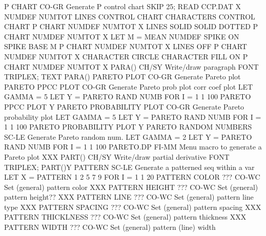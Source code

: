 P CHART                     CO-GR Generate P control chart
                                  SKIP 25; READ CCP.DAT X NUMDEF NUMTOT
                                  LINES CONTROL CHART
                                  CHARACTERS CONTROL CHART
                                  P CHART NUMDEF NUMTOT X
                                  LINES SOLID SOLID DOTTED
                                  P CHART NUMDEF NUMTOT X
                                  LET M = MEAN NUMDEF
                                  SPIKE ON
                                  SPIKE BASE M
                                  P CHART NUMDEF NUMTOT X
                                  LINES OFF
                                  P CHART NUMDEF NUMTOT X
                                  CHARACTER CIRCLE
                                  CHARACTER FILL ON
                                  P CHART NUMDEF NUMTOT X
PARA()                      CH/SY Write/draw paragraph
                                  FONT TRIPLEX; TEXT PARA()
PARETO PLOT                 CO-GR Generate Pareto plot
PARETO PPCC PLOT            CO-GR Generate Pareto prob plot corr coef plot
                                  LET GAMMA = 5
                                  LET Y = PARETO RAND NUMB FOR I = 1 1 100
                                  PARETO PPCC PLOT Y
PARETO PROBABILITY PLOT     CO-GR Generate Pareto probability plot
                                  LET GAMMA = 5
                                  LET Y = PARETO RAND NUMB FOR I = 1 1 100
                                  PARETO PROBABILITY PLOT Y
PARETO RANDOM NUMBERS       SC-LE Generate Pareto random num.
                                  LET GAMMA = 2
                                  LET Y = PARETO RAND NUMB FOR I = 1 1 100
PARETO.DP                   FI-MM Menu macro to generate a Pareto plot
                                  XXX
PART()                      CH/SY Write/draw partial derivative
                                  FONT TRIPLEX; PART()Y
PATTERN                     SC-LE Generate a patterned seq within a var
                                  LET X = PATTERN 1 2 5 7 9 FOR I = 1 1 20
PATTERN COLOR        ???    CO-WC Set (general) pattern color
                                  XXX
PATTERN HEIGHT       ???    CO-WC Set (general) pattern height??
                                  XXX
PATTERN LINE         ???    CO-WC Set (general) pattern line type
                                  XXX
PATTERN SPACING      ???    CO-WC Set (general) pattern spacing
                                  XXX
PATTERN THICKLNESS   ???    CO-WC Set (general) pattern thickness
XXX
PATTERN WIDTH        ???    CO-WC Set (general) pattern (line) width
